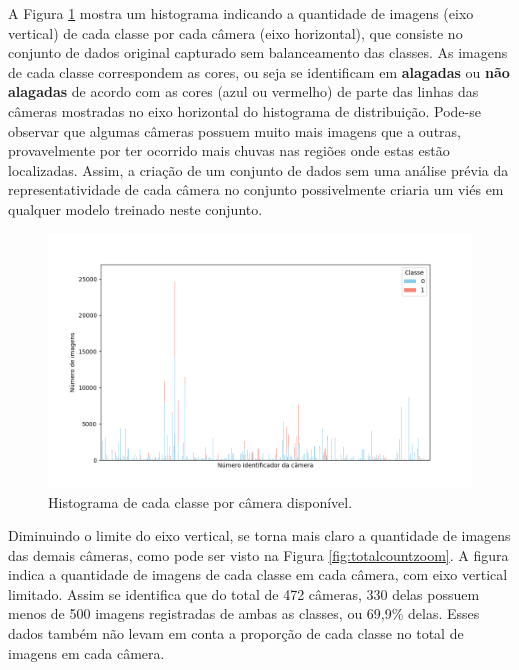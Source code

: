 A Figura \ref{fig:totalcount} mostra um histograma indicando a quantidade de imagens (eixo vertical) de cada classe por cada câmera (eixo horizontal), 
que consiste no conjunto de dados original capturado sem balanceamento das classes. 
As imagens de cada classe correspondem as cores, ou seja se identificam em \textbf{alagadas} ou \textbf{não alagadas} de acordo com as cores (azul ou vermelho) de parte das linhas das câmeras mostradas no eixo horizontal do histograma de distribuição. 
Pode-se observar que algumas câmeras possuem muito mais imagens que a outras, provavelmente por ter ocorrido mais chuvas nas regiões onde estas estão localizadas. 
Assim, a criação de um conjunto de dados sem uma análise prévia da representatividade de cada câmera no conjunto possivelmente criaria um viés em qualquer modelo treinado neste conjunto.

\begin{figure}[htb]
\centerline{\includegraphics[width=1\linewidth]{images/totalcount_code.png}}
\caption{Histograma de cada classe por câmera disponível.}
\label{fig:totalcount}
\end{figure}

Diminuindo o limite do eixo vertical, se torna mais claro a quantidade de imagens das demais câmeras, como pode ser visto na Figura \ref{fig:totalcountzoom}. A figura indica a quantidade de imagens de cada classe em cada câmera, com eixo vertical
limitado. Assim se identifica que do total de 472 câmeras, 330 delas possuem menos de 500 imagens registradas de ambas as classes, ou 69,9\% delas. Esses dados também não levam em conta a proporção de cada classe no total de imagens em cada câmera.

